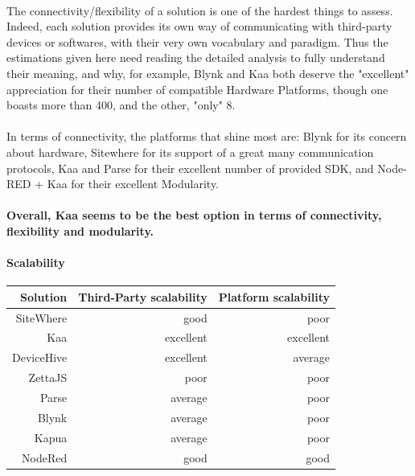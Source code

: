 \documentclass{article}
\begin{document}
\paragraph{} The connectivity/flexibility of a solution is one of the hardest things to assess. Indeed, each solution provides its own way of communicating with third-party devices or softwares, with their very own vocabulary and paradigm. Thus the estimations given here need reading the detailed analysis to fully understand their meaning, and why, for example, Blynk and Kaa both deserve the "excellent" appreciation for their number of compatible Hardware Platforms, though one boasts more than 400, and the other, "only" 8.

\paragraph{} In terms of connectivity, the platforms that shine most are: Blynk for its concern about hardware, Sitewhere for its support of a great many communication protocols, Kaa and Parse for their excellent number of provided SDK, and Node-RED + Kaa for their excellent Modularity.

\paragraph{} \textbf{Overall, Kaa seems to be the best option in terms of connectivity, flexibility and modularity.}

\paragraph{Scalability}

\begin{center}
\begin{tabular}{r|r|r}
Solution & Third-Party scalability & Platform scalability \\ \hline
SiteWhere & \cellcolor{blue!10}good & \cellcolor{orange!25}poor \\
Kaa & \cellcolor{green!25}excellent & \cellcolor{green!25}excellent \\
DeviceHive & \cellcolor{green!25}excellent & \cellcolor{yellow!25}average \\
ZettaJS & \cellcolor{orange!25}poor & \cellcolor{orange!25}poor \\
Parse & \cellcolor{yellow!25}average & \cellcolor{orange!25}poor \\
Blynk & \cellcolor{yellow!25}average & \cellcolor{orange!25}poor \\
Kapua & \cellcolor{yellow!25}average & \cellcolor{orange!25}poor \\
NodeRed & \cellcolor{blue!10}good & \cellcolor{blue!10}good \\
\end{tabular}
\end{center}
\end{document}

